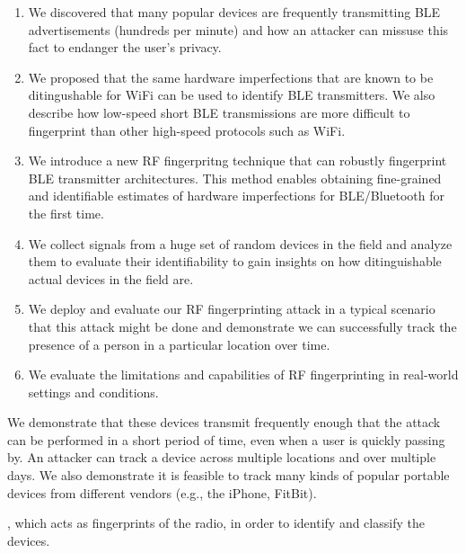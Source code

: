 \begin{enumerate}
%
\item We discovered that many popular devices are frequently transmitting BLE
	advertisements (hundreds per minute) and how an attacker can missuse this fact to endanger the user's privacy.
%
\item We proposed that the same hardware imperfections that are known to be ditingushable for WiFi can be used to identify BLE transmitters. We also describe how low-speed short BLE transmissions are more difficult to
	fingerprint than other high-speed protocols such as WiFi.
%
\item We introduce a new RF fingerpritng technique that can robustly
	fingerprint BLE transmitter architectures. This method enables obtaining fine-grained and identifiable estimates of hardware imperfections for BLE/Bluetooth for the first time.
%
\item We collect signals from a huge set of random devices in the field and analyze them to evaluate their identifiability to gain insights on how ditinguishable actual devices in the field are. 
%
\item We deploy and evaluate our RF fingerprinting attack in a typical scenario that this attack might be done and demonstrate we can successfully track the presence of a person in a particular location over time.
%
\item We evaluate the limitations and capabilities of RF fingerprinting in real-world settings and conditions.
%
\end{enumerate}



We demonstrate that these devices transmit frequently enough that the attack
can be performed in a short period of time, even when a user is quickly passing
by.
%
An attacker can track a device across multiple locations and over multiple
days.
%
We also demonstrate it is feasible to track many kinds of popular portable
devices from different vendors (e.g., the iPhone, FitBit).




, which acts
as fingerprints of the radio, in order to identify and classify the devices.

